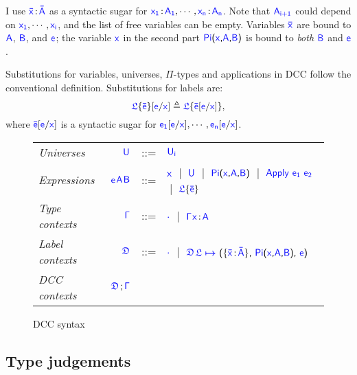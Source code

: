 I use $\itemtype{\bar{x}}{\bar{A}}$ as a syntactic sugar for $\itemtype{x_1}{A_1}, \cdots, \itemtype{x_n}{A_n}$. 
Note that $\target{A_{i+1}}$ could depend on $\target{x_1}, \cdots, \target{x_i}$, and the list of free variables can be empty. Variables $\target{\bar{x}}$ are bound to $\target{A}$, $\target{B}$, and $\target{e}$; the variable $\target{x}$ in the second part $\targetpi{x}{A}{B}$ is bound to \textit{both} $\target{B}$ and $\target{e}$. 

Substitutions for variables, universes, $\Pi$-types and applications in DCC follow the conventional definition. Substitutions for labels are:
\begin{equation*}
\targetlab{\flabel}{\bar{e}}\targetsub{e}{x} \triangleq \target{\flabel}\{\target{\bar{e}}\targetsub{e}{x}\},
\end{equation*}
where $\target{\bar{e}}\targetsub{e}{x}$ is a syntactic sugar for $\target{e_1}\targetsub{e}{x}, \cdots, \target{e_n}\targetsub{e}{x}$.

\begin{figure}[H]
	\renewcommand{\arraystretch}{1.3}
	\centering
	\begin{tabular}{l r l l}
		\textit{Universes}   & $\target{U} $       & ::= & $\target{U_i}$ \\
		\textit{Expressions} & $\target{e}$\sfcomma $\target{A}$\sfcomma $\target{B}$  & ::= & 
			$\target{x}$ $\ |\ $ $\target{U}$ $\ |\ $ $\targetpi{x}{A}{B}$ $\ |\ $ $\targetapp{e_1}{e_2}$ $\ |\ $ $\targetlab{\flabel}{\bar{e}}$\\
		\textit{Type contexts} & $\target{\Gamma}$ & ::= & $\target{\cdot}$ $\ |\ $ $\target{\Gamma}$\sfcomma $\itemtype{x}{A}$ \\
		\textit{Label contexts} & $\target{\fdef}$ & ::= & $\target{\cdot}$ $\ |\ $ 
			$\target{\fdef}$\sfcomma $\itemdef{\target{\flabel}}{\itemtype{\bar{x}}{\bar{A}}}{\targetpi{x}{A}{B}}{\target{e}}$\\
		\textit{DCC contexts} &$\targetcon$
	\end{tabular}

	\caption{DCC syntax}
    \label{fig:dcc syntax}
\end{figure}

\subsection{Type judgements}


